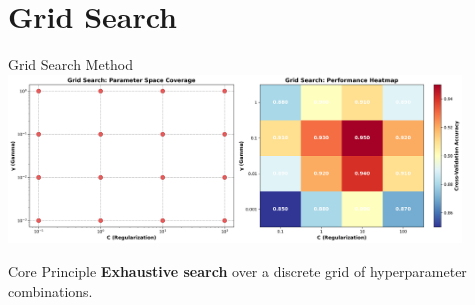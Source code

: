 \documentclass[8pt,aspectratio=1610]{beamer}
\begin{document}

\section{Grid Search}

\begin{frame}{Grid Search Method}
\centering
\includegraphics[width=0.9\textwidth]{../figures/grid_search_visualization.png}

\vspace{0.3cm}

\begin{alertblock}{Core Principle}
\textbf{Exhaustive search} over a discrete grid of hyperparameter combinations.
\end{alertblock}
\end{frame}
\end{document}
